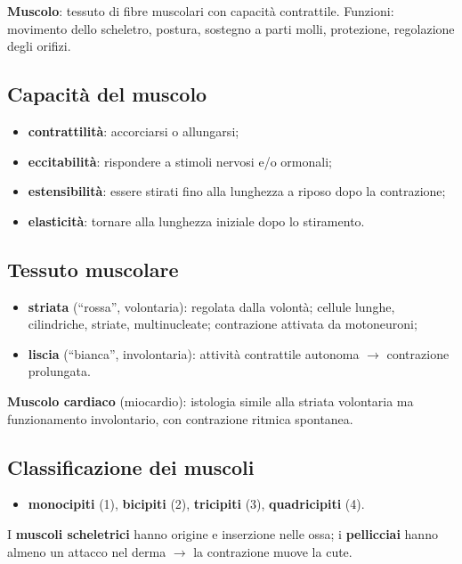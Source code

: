 \textbf{Muscolo}: tessuto di fibre muscolari con capacità contrattile. Funzioni: movimento dello
scheletro, postura, sostegno a parti molli, protezione, regolazione degli orifizi.

\subsection{Capacità del muscolo}
\begin{itemize}
  \item \textbf{contrattilità}: accorciarsi o allungarsi;
  \item \textbf{eccitabilità}: rispondere a stimoli nervosi e/o ormonali;
  \item \textbf{estensibilità}: essere stirati fino alla lunghezza a riposo dopo la contrazione;
  \item \textbf{elasticità}: tornare alla lunghezza iniziale dopo lo stiramento.
\end{itemize}

\subsection{Tessuto muscolare}
\begin{itemize}
  \item \textbf{striata} (``rossa'', volontaria): regolata dalla volontà; cellule lunghe,
    cilindriche, striate, multinucleate; contrazione attivata da motoneuroni;
  \item \textbf{liscia} (``bianca'', involontaria): attività contrattile autonoma $\rightarrow$
    contrazione prolungata.
\end{itemize}
\textbf{Muscolo cardiaco} (miocardio): istologia simile alla striata volontaria ma funzionamento
involontario, con contrazione ritmica spontanea.

\subsection{Classificazione dei muscoli}
\begin{itemize}
  \item \textbf{monocipiti} (1), \textbf{bicipiti} (2), \textbf{tricipiti} (3),
    \textbf{quadricipiti} (4).
\end{itemize}
I \textbf{muscoli scheletrici} hanno origine e inserzione nelle ossa; i \textbf{pellicciai} hanno
almeno un attacco nel derma $\rightarrow$ la contrazione muove la cute.

